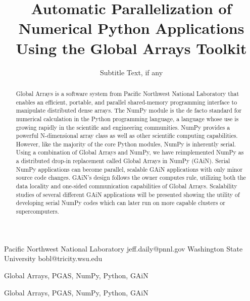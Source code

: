 \documentclass[preprint]{sigplanconf}
\begin{document}
\copyrightdata{[to be supplied]} 


\title{Automatic Parallelization of Numerical Python Applications Using the
Global Arrays Toolkit}
\subtitle{Subtitle Text, if any}

           {Pacific Northwest National Laboratory}
           {jeff.daily@pnnl.gov}
           {Washington State University}
           {bobl@tricity.wsu.edu}

\maketitle

\DefineShortVerb{\*}

\begin{abstract}
Global Arrays is a software system from Pacific Northwest National Laboratory
that enables an efficient, portable, and parallel shared-memory programming
interface to manipulate distributed dense arrays. The NumPy module is the de
facto standard for numerical calculation in the Python programming language, a
language whose use is growing rapidly in the scientific and engineering
communities. NumPy provides a powerful N-dimensional array class as well as
other scientific computing capabilities. However, like the majority of the
core Python modules, NumPy is inherently serial. Using a combination of Global
Arrays and NumPy, we have reimplemented NumPy as a distributed drop-in
replacement called Global Arrays in NumPy (GAiN). Serial NumPy applications
can become parallel, scalable GAiN applications with only minor source code
changes.  GAiN's design follows the owner computes rule, utilizing both the
data locality and one-sided communication capabilities of Global Arrays.
Scalability studies of several different GAiN applications will be presented
showing the utility of developing serial NumPy codes which can later run on
more capable clusters or supercomputers.
\end{abstract}


\terms
Global Arrays, PGAS, NumPy, Python, GAiN

\keywords
Global Arrays, PGAS, NumPy, Python, GAiN
\end{document}
